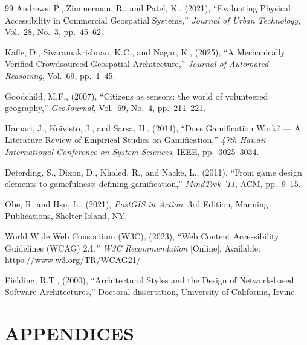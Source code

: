 \documentclass[12pt,a4paper]{report}
\begin{document}
\newpage
\begin{thebibliography}{99}
Andrews, P., Zimmerman, R., and Patel, K., (2021), ``Evaluating Physical Accessibility in Commercial Geospatial Systems,'' \textit{Journal of Urban Technology}, Vol.~28, No.~3, pp.~45--62.

Kafle, D., Sivaramakrishnan, K.C., and Nagar, K., (2025), ``A Mechanically Verified Crowdsourced Geospatial Architecture,'' \textit{Journal of Automated Reasoning}, Vol.~69, pp.~1--45.

Goodchild, M.F., (2007), ``Citizens as sensors: the world of volunteered geography,'' \textit{GeoJournal}, Vol.~69, No.~4, pp.~211--221.

Hamari, J., Koivisto, J., and Sarsa, H., (2014), ``Does Gamification Work? --- A Literature Review of Empirical Studies on Gamification,'' \textit{47th Hawaii International Conference on System Sciences}, IEEE, pp.~3025--3034.

Deterding, S., Dixon, D., Khaled, R., and Nacke, L., (2011), ``From game design elements to gamefulness: defining gamification,'' \textit{MindTrek '11}, ACM, pp.~9--15.

Obe, R. and Hsu, L., (2021), \textit{PostGIS in Action}, 3rd Edition, Manning Publications, Shelter Island, NY.

World Wide Web Consortium (W3C), (2023), ``Web Content Accessibility Guidelines (WCAG) 2.1,'' \textit{W3C Recommendation} [Online]. Available: https://www.w3.org/TR/WCAG21/

Fielding, R.T., (2000), ``Architectural Styles and the Design of Network-based Software Architectures,'' Doctoral dissertation, University of California, Irvine.
\end{thebibliography}

\newpage
\chapter*{APPENDICES}
\end{document}
